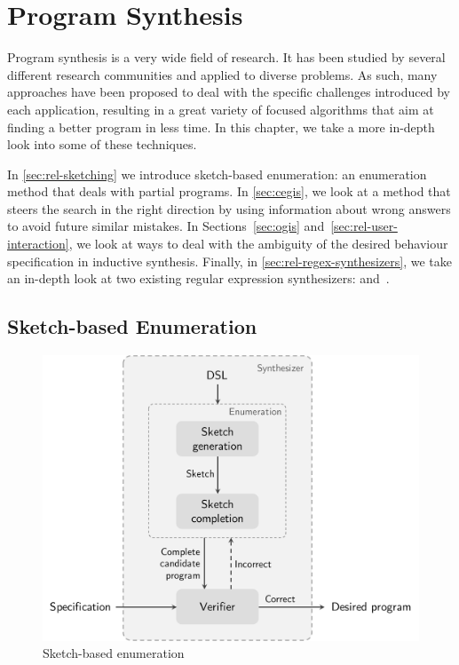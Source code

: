 \chapter{Program Synthesis}\label{chap:program-synthesis}


Program synthesis is a very wide field of research. It has been studied by several different research communities and applied to diverse problems. As such, many approaches have been proposed to deal with the specific challenges introduced by each application, resulting in a great variety of focused algorithms that aim at finding a better program in less time. In this chapter, we take a more in-depth look into some of these techniques.

In \autoref{sec:rel-sketching} we introduce sketch-based enumeration: an enumeration method that deals with partial programs. In \autoref{sec:cegis}, we look at a method that steers the search in the right direction by using information about wrong answers to avoid future similar mistakes.
%
In Sections~\ref{sec:ogis} and~\ref{sec:rel-user-interaction}, we look at ways to deal with the ambiguity of the desired behaviour specification in inductive synthesis.
%
Finally, in \autoref{sec:rel-regex-synthesizers}, we take an in-depth look at two existing regular expression synthesizers: \AlphaRegex and~\Regel.

\section{Sketch-based Enumeration}\label{sec:rel-sketching}

\begin{figure}
    \centering
    \includegraphics[scale=.35]{pictures/sketch.pdf}
    \caption{Sketch-based enumeration}
    \label{fig:sketch_enumeration}
\end{figure}

